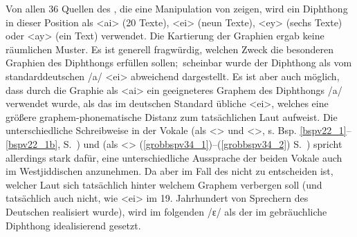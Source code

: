  
  Von allen 36 Quellen des , die eine Manipulation von  zeigen, wird ein  Diphthong in dieser Position als <ai> (20 Texte), <ei> (neun Texte), <ey> (sechs Texte) oder <ay> (ein Text) verwendet. Die Kartierung der Graphien ergab keine räumlichen Muster. Es ist generell fragwürdig, welchen Zweck die besonderen Graphien des Diphthongs erfüllen sollen;\, scheinbar wurde der Diphthong als vom standarddeutschen /a\textsubarch{\textsci}/ <ei> abweichend dargestellt. Es ist aber auch möglich, dass durch die Graphie als <ai> ein  geeigneteres Graphem des Diphthongs /a\textsubarch{\textsci}/ verwendet wurde, als das im deutschen Standard übliche <ei>, welches eine größere graphem-phonematische Distanz zum tatsächlichen Laut aufweist. Die unterschiedliche Schreibweise in  der Vokale  (als <> und <>, %
  s. Bsp.  \ref{bspv22_1}–\ref{bspv22_1b}, S.\, \pageref{bspv22_1}) und   (als <>  (\ref{grobbspv34_1})–(\ref{grobbspv34_2}) S.\, \pageref{grobbspv34_1}) spricht allerdings stark dafür, eine unterschiedliche Aussprache der beiden Vokale auch im Westjiddischen anzunehmen. Da aber im Fall des \hai{{\LiJi}} nicht zu entscheiden ist, welcher Laut sich tatsächlich hinter welchem Graphem verbergen soll (und tatsächlich auch nicht, wie <ei> im 19. Jahrhundert von Sprechern des Deutschen realisiert wurde), wird im folgenden /ɛ\textsubarch{\textsci}/ als der im \hai{{\WJ}} gebräuchliche Diphthong idealisierend gesetzt. 
 

